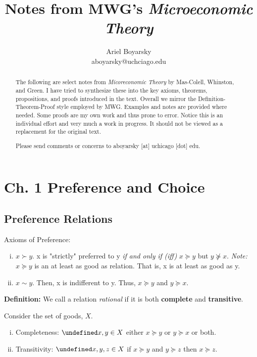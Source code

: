 \documentclass[12pt]{article}
\let\oldforall\forall
\let\forall\undefined
\DeclareMathOperator{\forall}{\,\oldforall\,}
\begin{document}
\title{Notes from MWG's \emph{Microeconomic Theory}} %
\author{Ariel Boyarsky\\ aboyarsky@uchciago.edu} %
 
\maketitle


\begin{abstract}
The following are select notes from \emph{Micoreconomic Theory} by Mas-Colell, Whinston, and Green. I have tried to synthesize these into the key axioms, theorems, propositions, and proofs introduced in the text. Overall we mirror the Definition-Theorem-Proof style employed by MWG. Examples and notes are provided where needed. Some proofs are my own work and thus prone to error. Notice this is an individual effort and very much a work in progress. It should not be viewed as a replacement for the original text. 

Please send comments or concerns to aboyarsky [at] uchicago [dot] edu.
\end{abstract}
\section{Ch. 1 Preference and Choice}
\subsection{Preference Relations}
Axioms of Preference:
\begin{enumerate}[i.]
	\item $x \succ y$. x is "strictly" preferred to y \emph{if and only if (iff)} $x \succeq y$ but $y \not\succeq x$. 
	\emph{Note:} $x \succeq y$ is an at least as good as relation. That is, x is at least as good as y. 
	\item $x \sim y$. Then,  x is indifferent to y. Thus,  $x \succeq y$ and $y \succeq x$.
\end{enumerate}

\textbf{Definition:} We call a relation \emph{rational} if it is both \textbf{complete} and \textbf{transitive}.

Consider the set of goods, $X$.
\begin{enumerate}[i.]
	\item Completeness: $\forall x,y \in X$ either $x \succeq y$ or $y \succeq x$ or both.
	\item Transitivity: $\forall x,y,z \in X$ if $x \succeq y$ and $y \succeq z$ then $x \succeq z$.
\end{enumerate}
\end{document}
